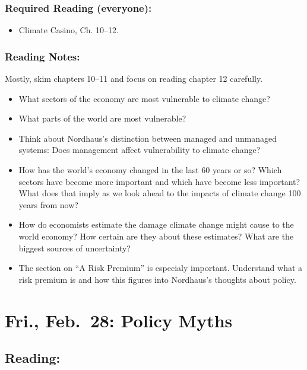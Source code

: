 \documentclass[
]{article}
\providecommand{\tightlist}{%
  \setlength{\itemsep}{0pt}\setlength{\parskip}{0pt}}
\begin{document}
\hypertarget{required-reading-everyone-16}{%
\subsubsection{Required Reading
(everyone):}\label{required-reading-everyone-16}}

\begin{itemize}
\tightlist
\item
  Climate Casino, Ch. 10--12.
\end{itemize}

\hypertarget{reading-notes-16}{%
\subsubsection{Reading Notes:}\label{reading-notes-16}}

Mostly, skim chapters 10--11 and focus on reading chapter 12 carefully.

\begin{itemize}
\tightlist
\item
  What sectors of the economy are most vulnerable to climate change?
\item
  What parts of the world are most vulnerable?
\item
  Think about Nordhaus's distinction between managed and unmanaged
  systems: Does management affect vulnerability to climate change?
\item
  How has the world's economy changed in the last 60 years or so? Which
  sectors have become more important and which have become less
  important? What does that imply as we look ahead to the impacts of
  climate change 100 years from now?
\item
  How do economists estimate the damage climate change might cause to
  the world economy? How certain are they about these estimates? What
  are the biggest sources of uncertainty?
\item
  The section on ``A Risk Premium'' is especialy important. Understand
  what a risk premium is and how this figures into Nordhaus's thoughts
  about policy.
\end{itemize}

\hypertarget{fri.-feb.-28-policy-myths}{%
\section{Fri., Feb.~28: Policy Myths}\label{fri.-feb.-28-policy-myths}}

\hypertarget{reading-22}{%
\subsection{Reading:}\label{reading-22}}
\end{document}
